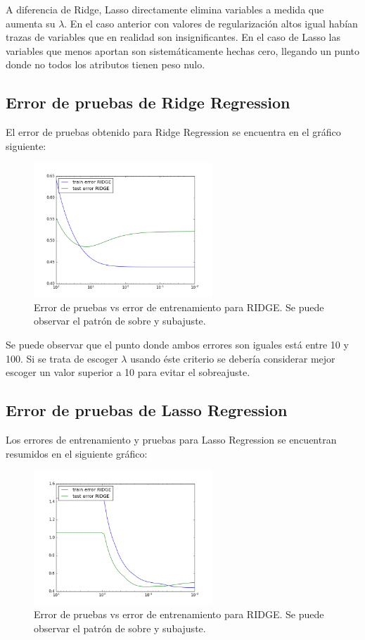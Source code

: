 \documentclass[letter, 10pt]{article}
\begin{document}
A diferencia de Ridge, Lasso directamente elimina variables a medida que aumenta
su $\lambda$. En el caso anterior con valores de regularización altos igual
habían trazas de variables que en realidad son insignificantes. En el caso de
Lasso las variables que menos aportan son sistemáticamente hechas cero, llegando
un punto donde no todos los atributos tienen peso nulo.

\subsection{Error de pruebas de Ridge Regression}
El error de pruebas obtenido para Ridge Regression se encuentra en el gráfico
siguiente:

\begin{figure}[H]
  \centering
  \includegraphics[width=0.6\textwidth]{Images/p3_fig3.png} 
  \caption{Error de pruebas vs error de entrenamiento para RIDGE. Se puede
    observar el patrón de sobre y subajuste.}
  \label{fig:p3_g2}
\end{figure}

Se puede observar que el punto donde ambos errores son iguales está entre 10 y
100. Si se trata de escoger $\lambda$ usando éste criterio se debería considerar
mejor escoger un valor superior a 10 para evitar el sobreajuste.
\subsection{Error de pruebas de Lasso Regression}
Los errores de entrenamiento y pruebas para Lasso Regression se encuentran
resumidos en el siguiente gráfico:

\begin{figure}[H]
  \centering
  \includegraphics[width=0.6\textwidth]{Images/p3_fig4.png} 
  \caption{Error de pruebas vs error de entrenamiento para RIDGE. Se puede
    observar el patrón de sobre y subajuste.}
  \label{fig:p3_g2}
\end{figure}
\end{document}
